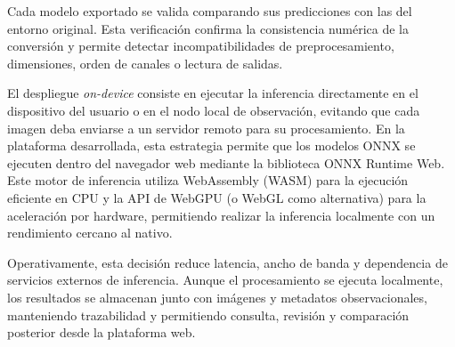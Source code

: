 Cada modelo exportado se valida comparando sus predicciones con las del entorno
original. Esta verificación confirma la consistencia numérica de la conversión y
permite detectar incompatibilidades de preprocesamiento, dimensiones, orden de
canales o lectura de salidas.

El despliegue \textit{on-device} consiste en ejecutar la inferencia directamente
en el dispositivo del usuario o en el nodo local de observación, evitando que
cada imagen deba enviarse a un servidor remoto para su procesamiento. En la
plataforma desarrollada, esta estrategia permite que los modelos ONNX se
ejecuten dentro del navegador web mediante la biblioteca ONNX Runtime Web. 
Este motor de inferencia utiliza WebAssembly (WASM) para la ejecución 
eficiente en CPU y la API de WebGPU (o WebGL como alternativa) para la 
aceleración por hardware, permitiendo realizar la inferencia localmente con 
un rendimiento cercano al nativo.

Operativamente, esta decisión reduce latencia, ancho de banda y dependencia de
servicios externos de inferencia. Aunque el procesamiento se ejecuta localmente,
los resultados se almacenan junto con imágenes y metadatos observacionales,
manteniendo trazabilidad y permitiendo consulta, revisión y comparación posterior
desde la plataforma web.
